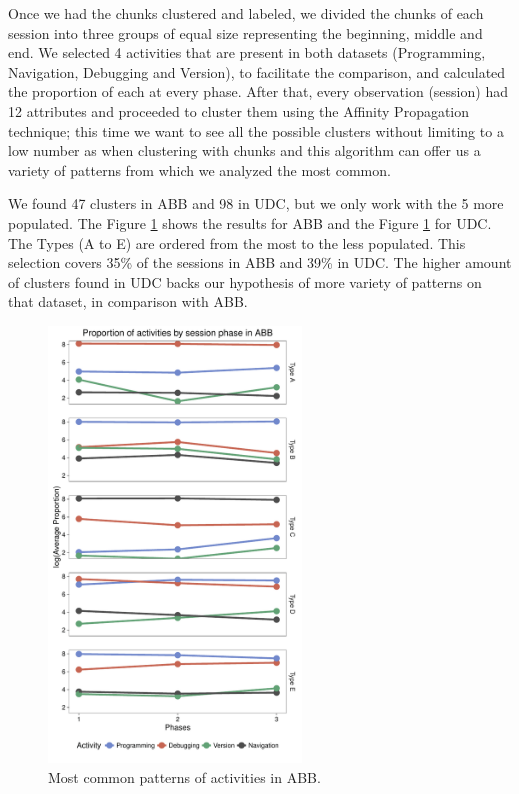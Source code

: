 Once we had the chunks clustered and labeled, we divided the chunks of each session into three groups of equal size representing the beginning, middle and end. We selected 4 activities that are present in both datasets (Programming, Navigation, Debugging and Version), to facilitate the comparison, and calculated the proportion of each at every phase. After that, every observation (session) had 12 attributes and proceeded to cluster them using the Affinity Propagation technique; this time we want to see all the possible clusters without limiting to a low number as when clustering with chunks and this algorithm can offer us a variety of patterns from which we analyzed the most common.

We found 47 clusters in ABB and 98 in UDC, but we only work with the 5 more populated. The Figure \ref{ABB_phases} shows the results for ABB and the Figure \ref{ABB_phases} for UDC. The Types (A to E) are ordered from the most to the less populated. This selection covers 35\% of the sessions in ABB and 39\% in UDC. The higher amount of clusters found in UDC backs our hypothesis of more variety of patterns on that dataset, in comparison with ABB.

\begin{figure}[!ht]
	
	\centering
	\includegraphics[width=0.6\textwidth]{Figures/ABB_phases_log}
	
	\caption{Most common patterns of activities in ABB.}
	\label{ABB_phases}
\end{figure}


